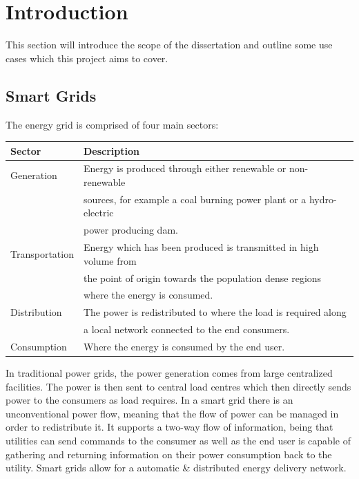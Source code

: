 \chapter{Introduction}
This section will introduce the scope of the dissertation and outline some use cases which this project aims to cover.
\section{Smart Grids}
The energy grid is comprised of four main sectors:

        \begin{center}
            \begin{tabular}{|l |l|}
            \hline
             \textbf{Sector} & \textbf{Description} \\
             \hline
             \hline
             Generation & 
             Energy is produced through either renewable or non-renewable \\ &
             sources, for example a coal burning power plant or a hydro-electric \\  &
             power producing dam. \\
             \hline
             Transportation & 
             Energy which has been produced is transmitted in high volume from \\ &
             the point of origin towards the population dense regions \\ &
             where the energy is consumed. \\
             \hline
             Distribution & 
             The power is redistributed to where the load is required along \\ &
             a local network connected to the end consumers. \\ 
             \hline
             Consumption & 
             Where the energy is consumed by the end user. \\
             \hline
            \end{tabular}
        \end{center}
In traditional power grids, the power generation comes from large centralized facilities. The power is then sent to central load centres which then directly sends power to the consumers as load requires. In a smart grid there is an unconventional power flow, meaning that the flow of power can be managed in order to redistribute it. It supports a two-way flow of information, being that utilities can send commands to the consumer as well as the end user is capable of gathering and returning information on their power consumption back to the utility. Smart grids allow for a automatic \& distributed energy delivery network.
